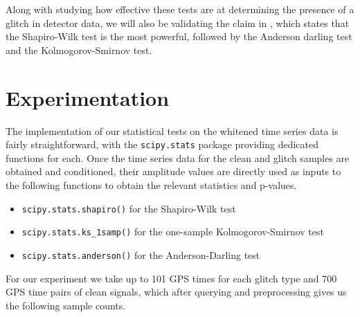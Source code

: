 \documentclass[12pt]{article}
\begin{document}
\medskip
\noindent Along with studying how effective these tests are at determining the presence of a glitch in detector data, we will also be validating the claim in \cite{razali2011power}, which states that the Shapiro-Wilk test is the most powerful, followed by the Anderson darling test and the Kolmogorov-Smirnov test.



\pagebreak
\section{Experimentation}\label{Experimentation}

The implementation of our statistical tests on the whitened time series data is fairly straightforward, with the \texttt{scipy.stats} package providing dedicated functions for each. Once the time series data for the clean and glitch samples are obtained and conditioned, their amplitude values are directly used as inputs to the following functions to obtain the relevant statistics and p-values.

\begin{itemize}
  \item \texttt{scipy.stats.shapiro()} for the Shapiro-Wilk test
  \item \texttt{scipy.stats.ks\_1samp()} for the one-sample Kolmogorov-Smirnov test
  \item \texttt{scipy.stats.anderson()} for the Anderson-Darling test
\end{itemize}

\medskip
\noindent For our experiment we take up to 101 GPS times for each glitch type and 700 GPS time pairs of clean signals, which after querying and preprocessing gives us the following sample counts.
\end{document}
